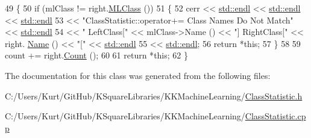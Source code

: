 \begin{DoxyCode}
49 \{
50   \textcolor{keywordflow}{if}  (mlClass != right.\hyperlink{class_k_k_m_l_l_1_1_class_statistic_a7f2775bca7634dd376ffe3c804e65c3e}{MLClass} ())
51   \{
52     cerr << \hyperlink{namespace_k_k_b_ad1f50f65af6adc8fa9e6f62d007818a8}{std::endl} << \hyperlink{namespace_k_k_b_ad1f50f65af6adc8fa9e6f62d007818a8}{std::endl} << \hyperlink{namespace_k_k_b_ad1f50f65af6adc8fa9e6f62d007818a8}{std::endl}
53          << \textcolor{stringliteral}{"ClassStatistic::operator+=        Class Names Do Not Match"} << 
      \hyperlink{namespace_k_k_b_ad1f50f65af6adc8fa9e6f62d007818a8}{std::endl}
54          << \textcolor{stringliteral}{"                LeftClass["} << mlClass->Name () << \textcolor{stringliteral}{"]   RightClass["}  << right.
      \hyperlink{class_k_k_m_l_l_1_1_class_statistic_a7cf87217e07220c5269dbd9f6299bb43}{Name} () << \textcolor{stringliteral}{"["} << \hyperlink{namespace_k_k_b_ad1f50f65af6adc8fa9e6f62d007818a8}{std::endl}
55          << \hyperlink{namespace_k_k_b_ad1f50f65af6adc8fa9e6f62d007818a8}{std::endl};
56     \textcolor{keywordflow}{return}  *\textcolor{keyword}{this};
57   \}
58 
59   count += right.\hyperlink{class_k_k_m_l_l_1_1_class_statistic_ace228f15b538c012781b4f6800c837c5}{Count} ();
60 
61   \textcolor{keywordflow}{return}  *\textcolor{keyword}{this};
62 \}
\end{DoxyCode}


The documentation for this class was generated from the following files\+:\begin{DoxyCompactItemize}
\item 
C\+:/\+Users/\+Kurt/\+Git\+Hub/\+K\+Square\+Libraries/\+K\+K\+Machine\+Learning/\hyperlink{_class_statistic_8h}{Class\+Statistic.\+h}\item 
C\+:/\+Users/\+Kurt/\+Git\+Hub/\+K\+Square\+Libraries/\+K\+K\+Machine\+Learning/\hyperlink{_class_statistic_8cpp}{Class\+Statistic.\+cpp}\end{DoxyCompactItemize}
